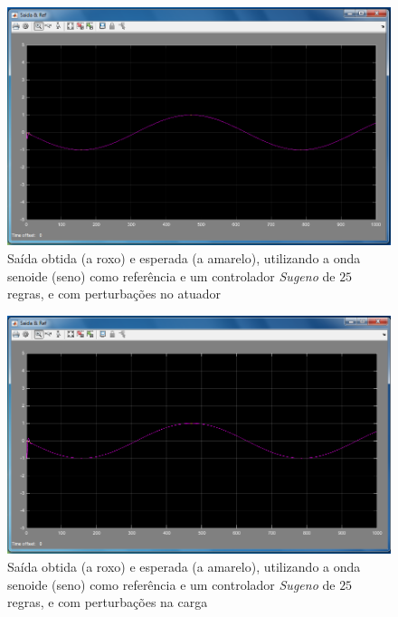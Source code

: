 \documentclass{article}
\begin{document}
\begin{figure}[h]
  \centering
      \includegraphics[scale=0.3]{Images/Sugeno_25_sin_actuator.png}
  \caption{Saída obtida (a roxo) e esperada (a amarelo), utilizando a onda senoide (seno) como referência e um controlador \emph{Sugeno} de $25$ regras, e com perturbações no atuador}
\end{figure}

\begin{figure}[h]
  \centering
      \includegraphics[scale=0.3]{Images/Sugeno_25_sin_charge.png}
  \caption{Saída obtida (a roxo) e esperada (a amarelo), utilizando a onda senoide (seno) como referência e um controlador \emph{Sugeno} de $25$ regras, e com perturbações na carga}
\end{figure}
\end{document}
